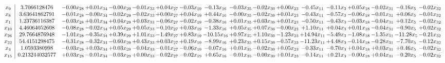 \documentclass[9pt]{article}
\begin{document}
 \[\begin{array}{c| c c@{\hskip 2pt} c@{\hskip 2pt} c@{\hskip 2pt} c@{\hskip 2pt} c@{\hskip 2pt} c@{\hskip 2pt} c@{\hskip 2pt} c@{\hskip 2pt} c@{\hskip 2pt} c@{\hskip 2pt} c@{\hskip 2pt} c@{\hskip 2pt} c@{\hskip 2pt} c@{\hskip 2pt} c@{\hskip 2pt} c@{\hskip 2pt} }
 x_{9}   &  3.7066128476 & -0.00 x_{28} & +  0.01 x_{34} & -0.00 x_{29} & -0.01 x_{33} & +  0.04 x_{27} & -0.03 x_{19} & -0.13 x_{16} & -0.03 x_{35} & -0.02 x_{30} & +  0.00 x_{23} & -0.45 x_{11} & -0.11 x_{3} & +  0.05 x_{18} & -0.02 x_{31} & -0.16 x_{5} & -0.02 x_{32}\\
 x_{8}   &  3.63641862791 & -0.01 x_{28} & -0.00 x_{34} & -0.02 x_{29} & -0.02 x_{33} & +  0.00 x_{27} & +  0.04 x_{19} & +  0.44 x_{16} & -0.00 x_{35} & -0.02 x_{30} & +  0.01 x_{23} & -0.43 x_{11} & -0.57 x_{3} & -0.06 x_{18} & -0.01 x_{31} & +  0.06 x_{5} & -0.01 x_{32}\\
 x_{1}   &  1.23736116387 & -0.03 x_{28} & +  0.01 x_{34} & +  0.04 x_{29} & +  0.03 x_{33} & -0.06 x_{27} & -0.02 x_{19} & -0.38 x_{16} & +  0.01 x_{35} & +  0.03 x_{30} & +  0.01 x_{23} & -0.50 x_{11} & -0.43 x_{3} & -0.03 x_{18} & -0.04 x_{31} & +  0.12 x_{5} & -0.02 x_{32}\\
 x_{10}   &  4.46064052608 & -0.08 x_{28} & -0.02 x_{34} & +  0.05 x_{29} & +  0.05 x_{33} & -0.10 x_{27} & +  0.03 x_{19} & -1.33 x_{16} & +  0.05 x_{35} & +  0.07 x_{30} & -0.00 x_{23} & +  1.10 x_{11} & +  0.04 x_{3} & +  0.01 x_{18} & -0.04 x_{31} & -0.90 x_{5} & +  0.02 x_{32}\\
 x_{26}   &  29.7664876948 & -1.01 x_{28} & -0.35 x_{34} & +  0.39 x_{29} & +  1.01 x_{33} & -1.49 x_{27} & +  0.83 x_{19} & -10.15 x_{16} & +  0.97 x_{35} & +  1.10 x_{30} & -1.23 x_{23} & + 14.94 x_{11} & -5.49 x_{3} & -1.08 x_{18} & -1.35 x_{31} & -11.28 x_{5} & -0.21 x_{32}\\
 x_{22}   &  54.4151298475 & -0.31 x_{28} & -0.32 x_{34} & -0.60 x_{29} & +  0.43 x_{33} & +  0.03 x_{27} & +  0.19 x_{19} & -8.99 x_{16} & +  0.23 x_{35} & +  0.15 x_{30} & -0.57 x_{23} & -11.23 x_{11} & +  4.48 x_{3} & -0.14 x_{18} & -0.28 x_{31} & -7.70 x_{5} & -0.12 x_{32}\\
 x_{4}   &  1.0593380998 & -0.03 x_{28} & +  0.03 x_{34} & +  0.03 x_{29} & -0.04 x_{33} & -0.01 x_{27} & -0.06 x_{19} & -0.07 x_{16} & +  0.01 x_{35} & -0.02 x_{30} & +  0.05 x_{23} & -0.33 x_{11} & -0.70 x_{3} & +  0.04 x_{18} & +  0.03 x_{31} & +  0.46 x_{5} & -0.02 x_{32}\\
 x_{15}   &  0.213244032577 & +  0.03 x_{28} & -0.01 x_{34} & -0.03 x_{29} & +  0.00 x_{33} & -0.02 x_{27} & -0.02 x_{19} & +  0.65 x_{16} & -0.01 x_{35} & -0.00 x_{30} & +  0.01 x_{23} & -0.14 x_{11} & +  0.21 x_{3} & -0.00 x_{18} & +  0.04 x_{31} & -0.20 x_{5} & -0.02 x_{32}\\

\end{array}\]
\end{document}
